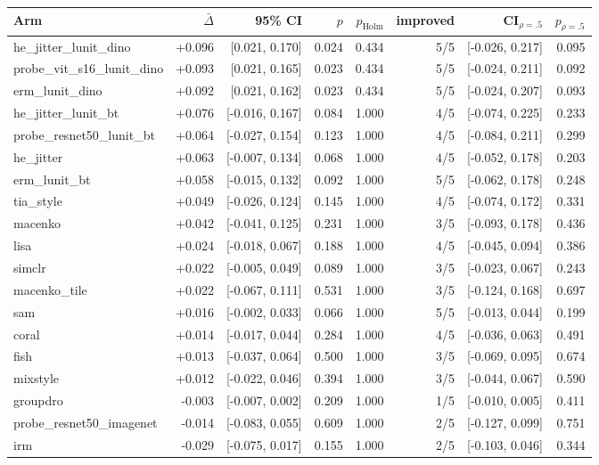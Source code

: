 \begin{tabular}{lrrrrrrr}
\toprule
Arm & $\bar\Delta$ & 95\% CI & $p$ & $p_\text{Holm}$ & improved & CI$_{\rho=.5}$ & $p_{\rho=.5}$ \\
\midrule
he\_jitter\_lunit\_dino & +0.096 & [0.021, 0.170] & 0.024 & 0.434 & 5/5 & [-0.026, 0.217] & 0.095 \\
probe\_vit\_s16\_lunit\_dino & +0.093 & [0.021, 0.165] & 0.023 & 0.434 & 5/5 & [-0.024, 0.211] & 0.092 \\
erm\_lunit\_dino & +0.092 & [0.021, 0.162] & 0.023 & 0.434 & 5/5 & [-0.024, 0.207] & 0.093 \\
he\_jitter\_lunit\_bt & +0.076 & [-0.016, 0.167] & 0.084 & 1.000 & 4/5 & [-0.074, 0.225] & 0.233 \\
probe\_resnet50\_lunit\_bt & +0.064 & [-0.027, 0.154] & 0.123 & 1.000 & 4/5 & [-0.084, 0.211] & 0.299 \\
he\_jitter & +0.063 & [-0.007, 0.134] & 0.068 & 1.000 & 4/5 & [-0.052, 0.178] & 0.203 \\
erm\_lunit\_bt & +0.058 & [-0.015, 0.132] & 0.092 & 1.000 & 5/5 & [-0.062, 0.178] & 0.248 \\
tia\_style & +0.049 & [-0.026, 0.124] & 0.145 & 1.000 & 4/5 & [-0.074, 0.172] & 0.331 \\
macenko & +0.042 & [-0.041, 0.125] & 0.231 & 1.000 & 3/5 & [-0.093, 0.178] & 0.436 \\
lisa & +0.024 & [-0.018, 0.067] & 0.188 & 1.000 & 4/5 & [-0.045, 0.094] & 0.386 \\
simclr & +0.022 & [-0.005, 0.049] & 0.089 & 1.000 & 3/5 & [-0.023, 0.067] & 0.243 \\
macenko\_tile & +0.022 & [-0.067, 0.111] & 0.531 & 1.000 & 3/5 & [-0.124, 0.168] & 0.697 \\
sam & +0.016 & [-0.002, 0.033] & 0.066 & 1.000 & 5/5 & [-0.013, 0.044] & 0.199 \\
coral & +0.014 & [-0.017, 0.044] & 0.284 & 1.000 & 4/5 & [-0.036, 0.063] & 0.491 \\
fish & +0.013 & [-0.037, 0.064] & 0.500 & 1.000 & 3/5 & [-0.069, 0.095] & 0.674 \\
mixstyle & +0.012 & [-0.022, 0.046] & 0.394 & 1.000 & 3/5 & [-0.044, 0.067] & 0.590 \\
groupdro & -0.003 & [-0.007, 0.002] & 0.209 & 1.000 & 1/5 & [-0.010, 0.005] & 0.411 \\
probe\_resnet50\_imagenet & -0.014 & [-0.083, 0.055] & 0.609 & 1.000 & 2/5 & [-0.127, 0.099] & 0.751 \\
irm & -0.029 & [-0.075, 0.017] & 0.155 & 1.000 & 2/5 & [-0.103, 0.046] & 0.344 \\
\bottomrule
\end{tabular}

